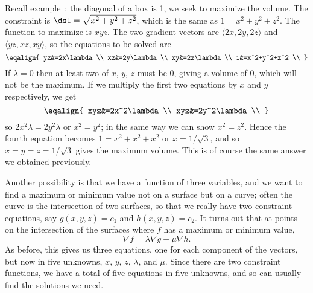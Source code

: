 \begin{example} 
Recall example~: the diagonal of a box is 1,
we seek to maximize the volume. The constraint is $\ds
1=\sqrt{x^2+y^2+z^2}$, which is the same as
$1=x^2+y^2+z^2$. The function to maximize is $xyz$. The two gradient
vectors are $\langle 2x,2y,2z\rangle$ and $\langle yz,xz,xy\rangle$,
so the equations to be solved are
$$\eqalign{
yz&=2x\lambda \\
xz&=2y\lambda \\
xy&=2z\lambda \\
1&=x^2+y^2+z^2 \\
}$$
If $\lambda=0$ then at least two of $x$, $y$, $z$ must be 0, giving a
volume of 0, which will not be the maximum. If we multiply the first
two equations by $x$ and $y$ respectively, we get
$$\eqalign{
xyz&=2x^2\lambda \\
xyz&=2y^2\lambda \\
}$$
so $2x^2\lambda=2y^2\lambda$ or $x^2=y^2$; in the same way we can show
$x^2=z^2$. Hence the fourth equation becomes
$1=x^2+x^2+x^2$ or $x=1/\sqrt3$, and so $x=y=z=1/\sqrt3$ gives the
maximum volume. This is of course the same answer we obtained
previously.
\end{example}

Another possibility is that we have a function of three variables, and
we want to find a maximum or minimum value not on a surface but on a
curve; often the curve is the intersection of two surfaces, so that we
really have two constraint equations, say $g(x,y,z)=c_1$ and
$h(x,y,z)=c_2$. It turns out that at points on the intersection of the
surfaces where $f$ has a maximum or minimum value,
$$\nabla f=\lambda\nabla g+\mu \nabla h.$$
As before, this gives us three equations, one for each component of
the vectors, but now in five unknowns, $x$, $y$, $z$, $\lambda$, and
$\mu$. Since there are two constraint functions, we have a total of
five equations in five unknowns, and so can usually find the solutions
we need.

